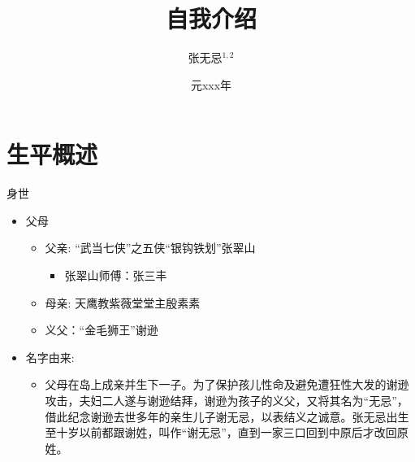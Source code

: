 \documentclass[t]{beamer}
\author{张无忌$^{1,2}$}
\institute{
$^{1}$ 明教 \\
$^{2}$University of Chinese Academy of Sciences, Beijing, China \\
}
\date{元xxx年}
\title{自我介绍}
\begin{document}
\titlepage
    
\section{生平概述}
\begin{frame}{身世}
    \begin{itemize}
        \item 父母
            \begin{itemize}
                \item 父亲: “武当七侠”之五侠“银钩铁划”张翠山
                    \begin{itemize}
                        \item 张翠山师傅：张三丰
                    \end{itemize}
                \item 母亲: 天鹰教紫薇堂堂主殷素素
                \item 义父：“金毛狮王”谢逊
            \end{itemize}

        \item 名字由来: 
            \begin{itemize}
                \item 父母在岛上成亲并生下一子。为了保护孩儿性命及避免遭狂性大发的谢逊攻击，夫妇二人遂与谢逊结拜，谢逊为孩子的义父，又将其名为“无忌”，借此纪念谢逊去世多年的亲生儿子谢无忌，以表结义之诚意。张无忌出生至十岁以前都跟谢姓，叫作“谢无忌”，直到一家三口回到中原后才改回原姓。
            \end{itemize}


    \end{itemize}
    
\end{frame}
\end{document}
